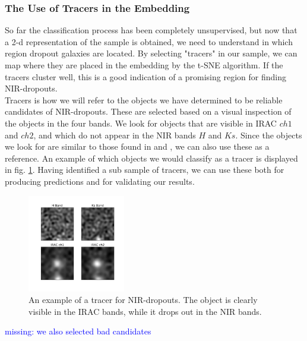 \subsubsection{The Use of Tracers in the Embedding}
So far the classification process has been completely unsupervised, but now that a 2-d representation of the sample is obtained, we need to understand in which region  dropout galaxies are located.  By selecting "tracers" in our sample, we can map where they are placed in the embedding by the t-SNE algorithm. If the tracers cluster well, this is a good indication of a promising region for finding NIR-dropouts. \\

Tracers is how we will refer to the objects we have determined to be reliable candidates of NIR-dropouts. These are selected based on a visual inspection of the objects in the four bands. We look for objects that are visible in IRAC $ch1$ and $ch2$, and which do not appear in the NIR bands $H$ and $Ks$. Since the objects we look for are similar to those found in \cite{Alcalde_Pampliega_2019} and \cite{Wang_2019}, we can also use these as a reference. An example of which objects we would classify as a tracer is displayed in fig. \ref{tracer_example}. Having identified a sub sample of tracers, we can use these both for producing predictions and for validating our results.
\begin{figure}
    \centering %
    \includegraphics[trim={1cm 2.5cm 2cm 1.5cm},clip,width=0.38\textwidth]{Code/Saved_Figures/good_example.pdf}
    \caption{An example of a tracer for NIR-dropouts. The object is clearly visible in the IRAC bands, while it drops out in the NIR bands.}
    \label{tracer_example}  
\end{figure}
\textcolor{blue}{missing: we also selected bad candidates}

